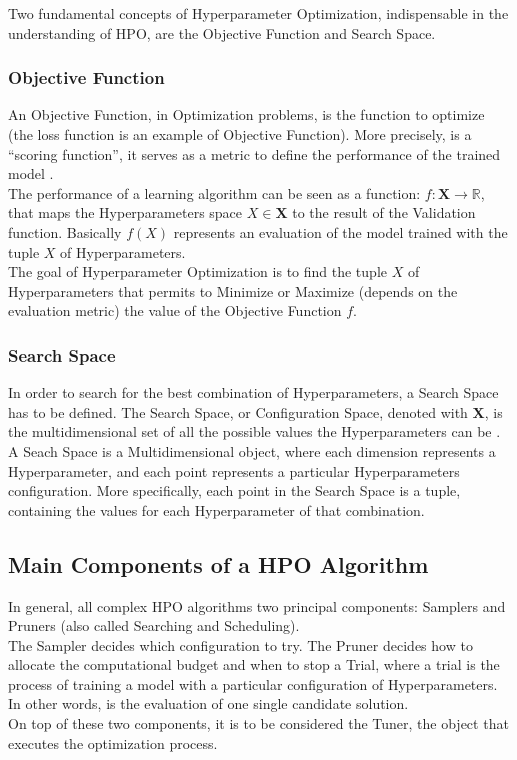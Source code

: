 Two fundamental concepts of Hyperparameter Optimization, indispensable in the understanding of HPO, are the Objective Function and Search Space.

\subsubsection{Objective Function}

An Objective Function, in Optimization problems, is the function to optimize (the loss function is an example of Objective Function). More precisely, is a “scoring function”, it serves as a metric to define the performance of the trained model \cite{Tesi-1.1} \cite{Tesi-1.6}.
\\[0.3cm]The performance of a learning algorithm can be seen as a function:  $f: \textbf{X} \to \mathbb{R}$, that maps the Hyperparameters space $X \in \textbf{X}$ to the result of the Validation function.
Basically $f(X)$ represents an evaluation of the model trained with the tuple $X$ of Hyperparameters.
\\[0.3cm]The goal of Hyperparameter Optimization is to find the tuple $X$ of Hyperparameters that permits to Minimize or Maximize (depends on the evaluation metric) the value of the Objective Function $f$.

\subsubsection{Search Space}

In order to search for the best combination of Hyperparameters, a Search Space has to be defined.
The Search Space, or Configuration Space, denoted with $\textbf{X}$, is the multidimensional set of all the possible values the Hyperparameters can be \cite{Tesi-1.6}.
\\[0.3cm]A Seach Space is a Multidimensional object, where each dimension represents a Hyperparameter, and each point represents a particular Hyperparameters configuration.
More specifically, each point in the Search Space is a tuple, containing the values for each Hyperparameter of that combination.

\subsection{Main Components of a HPO Algorithm}

In general, all complex HPO algorithms two principal components: Samplers and Pruners (also called Searching and Scheduling).
\\[0.3cm]The Sampler decides which configuration to try.
The Pruner decides how to allocate the computational budget and when to stop a Trial, where a trial is the process of training a model with a particular configuration of Hyperparameters. In other words, is the evaluation of one single candidate solution.
\\[0.3cm]On top of these two components, it is to be considered the Tuner, the object that executes the optimization process.

